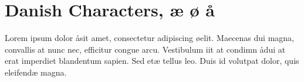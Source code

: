 \section{Danish Characters, æ ø å}
Lorem ipsum dolor åsit amet, consectetur adipiscing øelit. Maecenas dui magna, convallis at nunc nec, efficitur congue arcu. Vestibulum iit at condimn ådui at erat imperdiet blandentum sapien. Sed etæ tellus leo. Duis id volutpat dolor, quis eleifendæ magna.